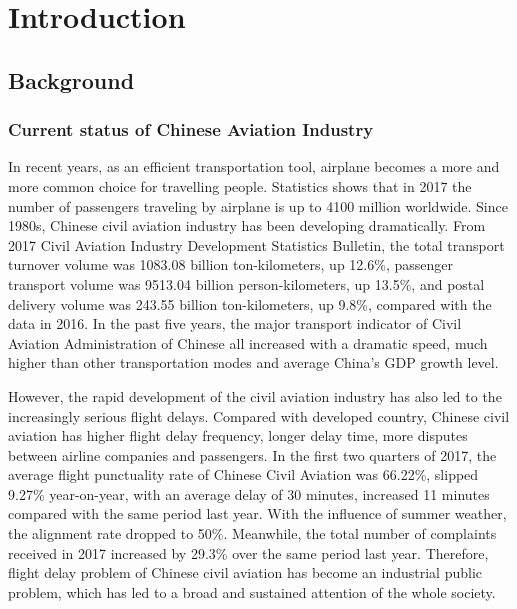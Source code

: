 \documentclass[senior]{IPSstyle}
\begin{document}
 \makepreliminarypages
 \singlespace
 \frontmatter
 \tableofcontents
 \listoffigures
 \listoftables
 \mainmatter
 \clearemptydoublepage
 \setlength{\baselineskip}{23.0pt}

\chapter{Introduction} \label{introduction}



\section{Background}

\subsection{Current status of Chinese Aviation Industry}
In recent years, as an efficient transportation tool, airplane becomes a more and more common choice for travelling people. Statistics shows that in 2017 the number of passengers traveling by airplane is up to 4100 million worldwide. 
Since 1980s, Chinese civil aviation industry has been developing dramatically. 
From 2017 Civil Aviation Industry Development Statistics Bulletin, the total transport turnover volume was 1083.08 billion ton-kilometers, up 12.6\%, passenger transport volume was 9513.04 billion person-kilometers, up 13.5\%, and postal delivery volume was 243.55 billion ton-kilometers, up 9.8\%, compared with the data in 2016. 
In the past five years, the major transport indicator of Civil Aviation Administration of Chinese all increased with a dramatic speed, much higher than other transportation modes and average China's GDP growth level.

However, the rapid development of the civil aviation industry has also led to the increasingly serious flight delays.
Compared with developed country, Chinese civil aviation has higher flight delay frequency, longer delay time, more disputes between airline companies and passengers.
In the first two quarters of 2017, the average flight punctuality rate of Chinese Civil Aviation was 66.22\%, slipped 9.27\% year-on-year, with an average delay of 30 minutes, increased 11 minutes compared with the same period last year. With the influence of summer weather, the alignment rate dropped to 50\%.
Meanwhile, the total number of complaints received in 2017 increased by 29.3\% over the same period last year.
Therefore, flight delay problem of Chinese civil aviation has become an industrial public problem, which has led to a broad and sustained attention of the whole society.
\end{document}
